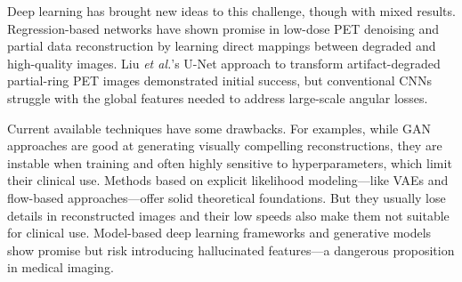 \documentclass[12pt]{iopart}
\begin{document}
Deep learning has brought new ideas to this challenge, though with mixed results. Regression-based networks have shown promise in low-dose PET denoising and partial data reconstruction \cite{Kandarpa_2021} by learning direct mappings between degraded and high-quality images. Liu \textit{et al.}'s U-Net approach to transform artifact-degraded partial-ring PET images \cite{liu2019} demonstrated initial success, but conventional CNNs struggle with the global features needed to address large-scale angular losses. 

Current available techniques have some drawbacks.
For examples, while GAN approaches are good at generating visually compelling reconstructions, \cite{xue2023cg3dsrganclassificationguided3d} they are instable when training and often highly sensitive to hyperparameters, which limit their clinical use.
Methods based on explicit likelihood modeling—like VAEs and flow-based approaches—offer solid theoretical foundations. But they usually lose details in reconstructed images and their low speeds also make them not suitable for clinical use.
Model-based deep learning frameworks and generative models \cite{reader2023, vashistha2024} show promise but risk introducing hallucinated features—a dangerous proposition in medical imaging.
\end{document}
